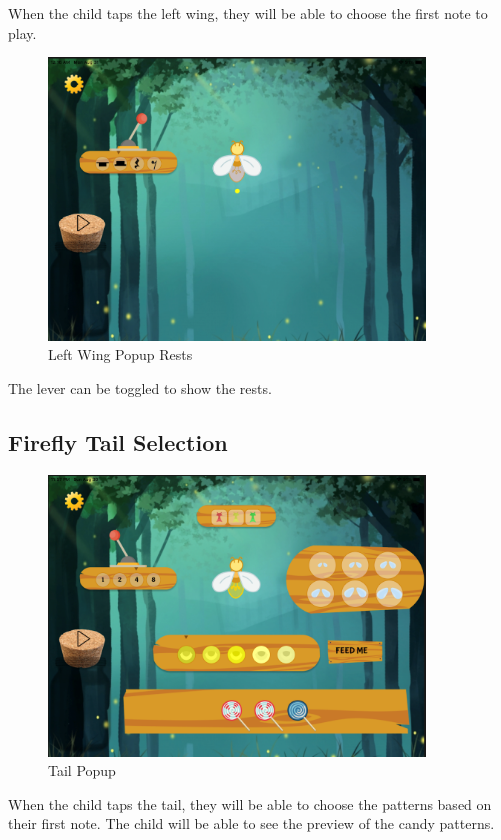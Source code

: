 When the child taps the left wing, they will be able to choose the first note to play.

\begin{figure}[H]
    \centering
    \includegraphics[width=10cm]{figures/newScreenFlows/newleftwing.png}
    \caption{Left Wing Popup Rests}
    \label{fig:newleftwing2}
\end{figure}

The lever can be toggled to show the rests.

\subsection{Firefly Tail Selection}

\begin{figure}[H]
    \centering
    \includegraphics[width=10cm]{figures/newScreenFlows/candypreview.png}
    \caption{Tail Popup}
    \label{fig:newtail}
\end{figure}

When the child taps the tail, they will be able to choose the patterns based on their first note. The child will be able to see the preview of the candy patterns.

